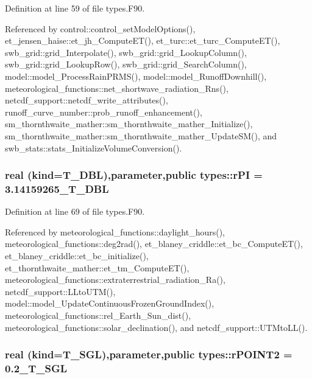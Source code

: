 Definition at line 59 of file types.F90.



Referenced by control::control\_\-setModelOptions(), et\_\-jensen\_\-haise::et\_\-jh\_\-ComputeET(), et\_\-turc::et\_\-turc\_\-ComputeET(), swb\_\-grid::grid\_\-Interpolate(), swb\_\-grid::grid\_\-LookupColumn(), swb\_\-grid::grid\_\-LookupRow(), swb\_\-grid::grid\_\-SearchColumn(), model::model\_\-ProcessRainPRMS(), model::model\_\-RunoffDownhill(), meteorological\_\-functions::net\_\-shortwave\_\-radiation\_\-Rns(), netcdf\_\-support::netcdf\_\-write\_\-attributes(), runoff\_\-curve\_\-number::prob\_\-runoff\_\-enhancement(), sm\_\-thornthwaite\_\-mather::sm\_\-thornthwaite\_\-mather\_\-Initialize(), sm\_\-thornthwaite\_\-mather::sm\_\-thornthwaite\_\-mather\_\-UpdateSM(), and swb\_\-stats::stats\_\-InitializeVolumeConversion().

\hypertarget{namespacetypes_a1f9e52478e9651360f7bd82fa744caa3}{
\subsubsection[{rPI}]{\setlength{\rightskip}{0pt plus 5cm}real (kind={\bf T\_\-DBL}),parameter,public {\bf types::rPI} = 3.14159265\_\-T\_\-DBL}}
\label{namespacetypes_a1f9e52478e9651360f7bd82fa744caa3}


Definition at line 69 of file types.F90.



Referenced by meteorological\_\-functions::daylight\_\-hours(), meteorological\_\-functions::deg2rad(), et\_\-blaney\_\-criddle::et\_\-bc\_\-ComputeET(), et\_\-blaney\_\-criddle::et\_\-bc\_\-initialize(), et\_\-thornthwaite\_\-mather::et\_\-tm\_\-ComputeET(), meteorological\_\-functions::extraterrestrial\_\-radiation\_\-Ra(), netcdf\_\-support::LLtoUTM(), model::model\_\-UpdateContinuousFrozenGroundIndex(), meteorological\_\-functions::rel\_\-Earth\_\-Sun\_\-dist(), meteorological\_\-functions::solar\_\-declination(), and netcdf\_\-support::UTMtoLL().

\hypertarget{namespacetypes_af161d4f0ffc44961986c81a32a2c82a7}{
\subsubsection[{rPOINT2}]{\setlength{\rightskip}{0pt plus 5cm}real (kind={\bf T\_\-SGL}),parameter,public {\bf types::rPOINT2} = 0.2\_\-T\_\-SGL}}
\label{namespacetypes_af161d4f0ffc44961986c81a32a2c82a7}


